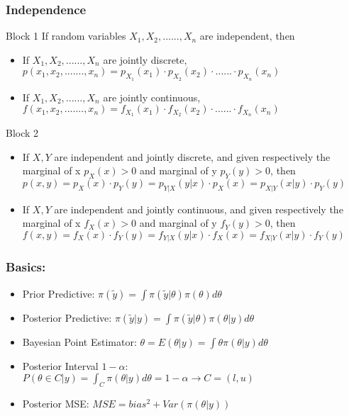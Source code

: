 \documentclass{beamer}
\begin{document}


\begin{frame}
\frametitle{Independence}
\begin{block}{Block 1}
If random variables $X_1, X_2, ...... , X_n$ are independent, then
\begin{itemize}
\item If $X_1, X_2, ......, X_n$ are jointly discrete, $p(x_1, x_2, ......., x_n) = p_{X_1}(x_1) \cdot p_{X_2}(x_2) \cdot ...... \cdot p_{X_n}(x_n)$
\item If $X_1, X_2, ......, X_n$ are jointly continuous, $f(x_1, x_2, ......., x_n) = f_{X_1}(x_1) \cdot f_{X_2}(x_2) \cdot ...... \cdot f_{X_n}(x_n)$
\end{itemize}
\end{block}

\begin{block}{Block 2}
\begin{itemize}
\item If $X,Y$ are independent and jointly discrete, and given respectively the marginal of x $p_X(x)>0$ and marginal of y $p_Y(y)>0$, then $p(x,y) = p_{X}(x) \cdot p_{Y}(y) = p_{Y|X}(y|x) \cdot p_{X}(x) = p_{X|Y}(x|y) \cdot p_{Y}(y)$
\item If $X,Y$ are independent and jointly continuous, and given respectively the marginal of x $f_X(x)>0$ and marginal of y $f_Y(y)>0$, then $f(x,y) = f_{X}(x) \cdot f_{Y}(y) = f_{Y|X}(y|x) \cdot f_{X}(x) = f_{X|Y}(x|y) \cdot f_{Y}(y)$
\end{itemize}
\end{block}


\end{frame}

\begin{frame}
\frametitle{Basics:}
\begin{itemize}
\item Prior Predictive: $\pi(\tilde y) = \int \pi(\tilde y|\theta) \pi(\theta) d\theta$

\item Posterior Predictive: $\pi(\tilde y|y) = \int \pi(\tilde y|\theta) \pi(\theta|y) d\theta$

\item Bayesian Point Estimator: $\theta = E(\theta|y) = \int \theta  \pi(\theta|y) d\theta$

\item Posterior Interval $1-\alpha$: $P(\theta \in C|y) = \int_C \pi(\theta|y) d\theta = 1-\alpha \rightarrow C=(l,u)$

\item Posterior MSE: $MSE = bias^2 + Var(\pi(\theta|y))$
\end{itemize}
\end{frame}
\end{document}
